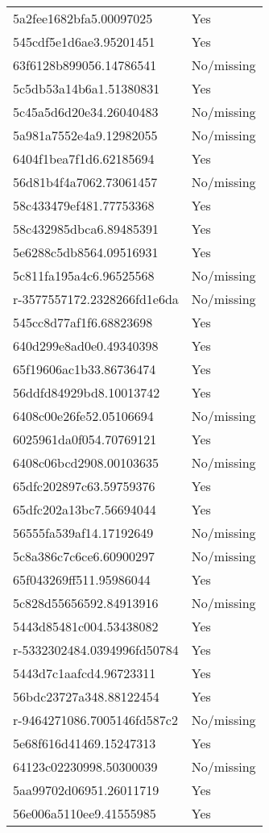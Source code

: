 \begin{tabular}{ll}
5a2fee1682bfa5.00097025 & Yes \\
545cdf5e1d6ae3.95201451 & Yes \\
63f6128b899056.14786541 & No/missing \\
5c5db53a14b6a1.51380831 & Yes \\
5c45a5d6d20e34.26040483 & No/missing \\
5a981a7552e4a9.12982055 & No/missing \\
6404f1bea7f1d6.62185694 & Yes \\
56d81b4f4a7062.73061457 & No/missing \\
58c433479ef481.77753368 & Yes \\
58c432985dbca6.89485391 & Yes \\
5e6288c5db8564.09516931 & Yes \\
5c811fa195a4c6.96525568 & No/missing \\
r-3577557172.2328266fd1e6da & No/missing \\
545cc8d77af1f6.68823698 & Yes \\
640d299e8ad0e0.49340398 & Yes \\
65f19606ac1b33.86736474 & Yes \\
56ddfd84929bd8.10013742 & Yes \\
6408c00e26fe52.05106694 & No/missing \\
6025961da0f054.70769121 & Yes \\
6408c06bcd2908.00103635 & No/missing \\
65dfc202897c63.59759376 & Yes \\
65dfc202a13bc7.56694044 & Yes \\
56555fa539af14.17192649 & No/missing \\
5c8a386c7c6ce6.60900297 & No/missing \\
65f043269ff511.95986044 & Yes \\
5c828d55656592.84913916 & No/missing \\
5443d85481c004.53438082 & Yes \\
r-5332302484.0394996fd50784 & Yes \\
5443d7c1aafcd4.96723311 & Yes \\
56bdc23727a348.88122454 & Yes \\
r-9464271086.7005146fd587c2 & No/missing \\
5e68f616d41469.15247313 & Yes \\
64123c02230998.50300039 & No/missing \\
5aa99702d06951.26011719 & Yes \\
56e006a5110ee9.41555985 & Yes \\

\end{tabular}
